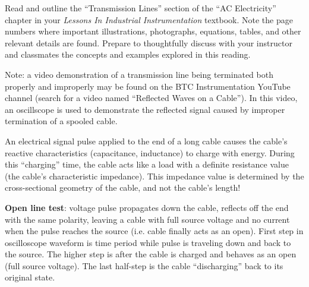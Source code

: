 

Read and outline the ``Transmission Lines'' section of the ``AC Electricity'' chapter in your {\it Lessons In Industrial Instrumentation} textbook.  Note the page numbers where important illustrations, photographs, equations, tables, and other relevant details are found.  Prepare to thoughtfully discuss with your instructor and classmates the concepts and examples explored in this reading.

\vskip 30pt

Note: a video demonstration of a transmission line being terminated both properly and improperly may be found on the BTC Instrumentation YouTube channel (search for a video named ``Reflected Waves on a Cable'').  In this video, an oscillscope is used to demonstrate the reflected signal caused by improper termination of a spooled cable.














An electrical signal pulse applied to the end of a long cable causes the cable's reactive characteristics (capacitance, inductance) to charge with energy.  During this ``charging'' time, the cable acts like a load with a definite resistance value (the cable's characteristic impedance).  This impedance value is determined by the cross-sectional geometry of the cable, and not the cable's length!

\vskip 10pt

{\bf Open line test}: voltage pulse propagates down the cable, reflects off the end with the same polarity, leaving a cable with full source voltage and no current when the pulse reaches the source (i.e. cable finally acts as an open).  First step in oscilloscope waveform is time period while pulse is traveling down and back to the source.  The higher step is after the cable is charged and behaves as an open (full source voltage).  The last half-step is the cable ``discharging'' back to its original state.

\vskip 10pt

